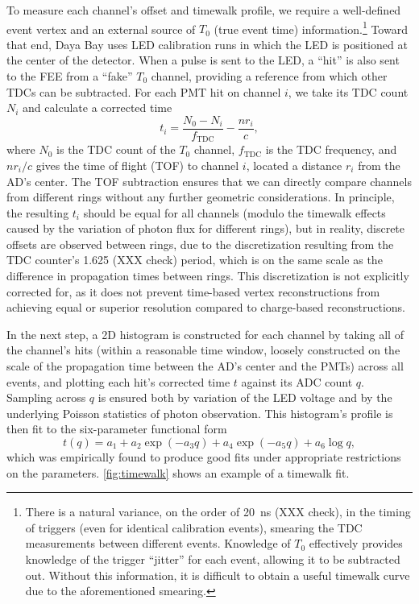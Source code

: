 \documentclass[../thesis.tex]{subfiles}
\begin{document}
To measure each channel's offset and timewalk profile, we require a well-defined event vertex and an external source of $T_0$ (true event time) information.\footnote{There is a natural variance, on the order of 20~ns (XXX check), in the timing of triggers (even for identical calibration events), smearing the TDC measurements between different events. Knowledge of $T_0$ effectively provides knowledge of the trigger ``jitter'' for each event, allowing it to be subtracted out. Without this information, it is difficult to obtain a useful timewalk curve due to the aforementioned smearing.} Toward that end, Daya Bay uses LED calibration runs in which the LED is positioned at the center of the detector. When a pulse is sent to the LED, a ``hit'' is also sent to the FEE from a ``fake'' $T_0$ channel, providing a reference from which other TDCs can be subtracted. For each PMT hit on channel $i$, we take its TDC count $N_i$ and calculate a corrected time
\begin{equation*}
  t_i = \frac{N_0 - N_i}{f_\mathrm{TDC}} - \frac{n r_i}{c},  
\end{equation*}
where $N_0$ is the TDC count of the $T_0$ channel, $f_\mathrm{TDC}$ is the TDC frequency, and $nr_i/c$ gives the time of flight (TOF) to channel $i$, located a distance $r_i$ from the AD's center. The TOF subtraction ensures that we can directly compare channels from different rings without any further geometric considerations. In principle, the resulting $t_i$ should be equal for all channels (modulo the timewalk effects caused by the variation of photon flux for different rings), but in reality, discrete offsets are observed between rings, due to the discretization resulting from the TDC counter's 1.625 (XXX check) period, which is on the same scale as the difference in propagation times between rings. This discretization is not explicitly corrected for, as it does not prevent time-based vertex reconstructions from achieving equal or superior resolution compared to charge-based reconstructions.

In the next step, a 2D histogram is constructed for each channel by taking all of the channel's hits (within a reasonable time window, loosely constructed on the scale of the propagation time between the AD's center and the PMTs) across all events, and plotting each hit's corrected time $t$ against its ADC count $q$. Sampling across $q$ is ensured both by variation of the LED voltage and by the underlying Poisson statistics of photon observation. This histogram's profile is then fit to the six-parameter functional form
\begin{equation*}
  t(q) = a_1 + a_2 \exp (-a_3 q) + a_4 \exp (-a_5 q) + a_6 \log q,
\end{equation*}
which was empirically found to produce good fits under appropriate restrictions on the parameters. \autoref{fig:timewalk} shows an example of a timewalk fit.
\end{document}
